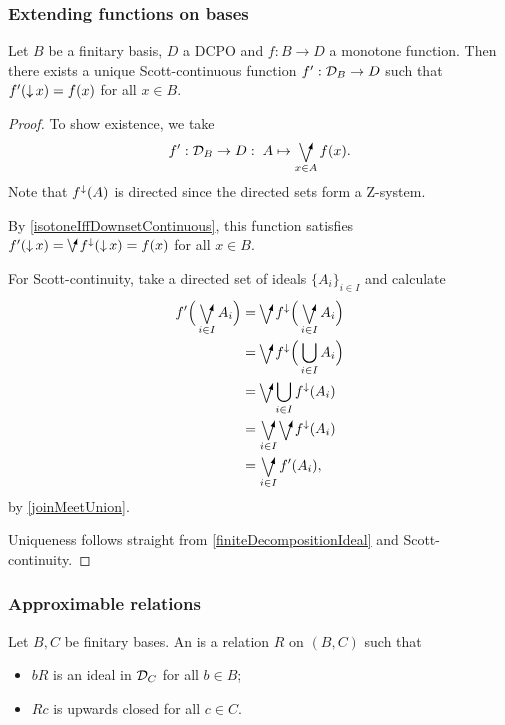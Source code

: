 \subsubsection{Extending functions on bases}
\begin{proposition}
Let $B$ be a finitary basis, $D$ a DCPO and $f: B \to D$ a monotone function. Then there exists a unique Scott-continuous function $f': \mathcal{D}_B\to D$ such that $f'(\operatorname{\downarrow} x) = f(x)$ for all $x\in B$.
\end{proposition}
\begin{proof}
To show existence, we take
\[ f': \domain_B \to D: \; A \mapsto \dirvee_{x\in A} f(x). \]
Note that $f^\downarrow(A)$ is directed since the directed sets form a $\mathrm{Z}$-system.

By \ref{isotoneIffDownsetContinuous}, this function satisfies $f'(\downset x) = \dirvee f^\imf(\downset x) = f(x)$ for all $x\in B$.

For Scott-continuity, take a directed set of ideals $\{A_i\}_{i\in I}$ and calculate
\begin{align*}
f'\Big(\dirvee_{i\in I} A_i\Big) &= \dirvee f^\imf\Big(\dirvee_{i\in I}A_i \Big) \\
&= \dirvee f^\imf\Big(\bigcup_{i\in I}A_i \Big) \\
&= \dirvee \bigcup_{i\in I} f^\imf(A_i) \\
&= \dirvee_{i\in I} \dirvee f^\imf(A_i) \\
&= \dirvee_{i\in I} f'(A_i),
\end{align*}
by \ref{joinMeetUnion}.

Uniqueness follows straight from \ref{finiteDecompositionIdeal} and Scott-continuity.
\end{proof}

\subsubsection{Approximable relations}
\begin{definition}
Let $B,C$ be finitary bases. An  is a relation $R$ on $(B,C)$ such that
\begin{itemize}
\item $bR$ is an ideal in $\mathcal{D}_C$ for all $b\in B$;
\item $Rc$ is upwards closed for all $c\in C$.
\end{itemize}
\end{definition}

